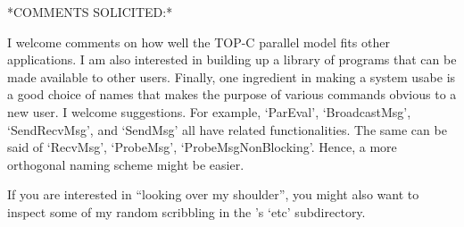 

*COMMENTS SOLICITED:*

I welcome comments on how  well  the  TOP-C  parallel  model  fits  other
applications. I am also interested in building up a library of  {\ParGAP}
programs that  can  be  made  available  to  other  users.  Finally,  one
ingredient in making a system usabe is a good choice of names that  makes
the purpose of  various  commands  obvious  to  a  new  user.  I  welcome
suggestions. For example, `ParEval', `BroadcastMsg',  `SendRecvMsg',  and
`SendMsg' all have related functionalities.  The  same  can  be  said  of
`RecvMsg', `ProbeMsg', `ProbeMsgNonBlocking'. Hence,  a  more  orthogonal
naming scheme might be easier.

If you are interested in ``looking over my  shoulder'',  you  might  also
want to inspect some of my random scribbling  in  the  {\ParGAP}'s  `etc'
subdirectory.


